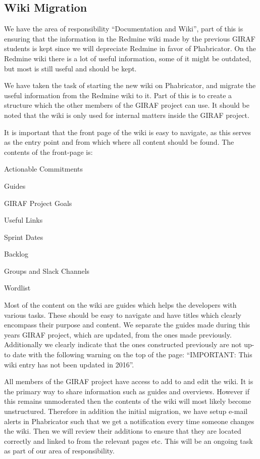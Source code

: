 \subsection{Wiki Migration}
We have the area of responsibility ``Documentation and Wiki'', part of this is ensuring that the information in the Redmine wiki made by the previous GIRAF students is kept since we will depreciate Redmine in favor of Phabricator.
On the Redmine wiki there is a lot of useful information, some of it might be outdated, but most is still useful and should be kept. 

We have taken the task of starting the new wiki on Phabricator, and migrate the useful information from the Redmine wiki to it.
Part of this is to create a structure which the other members of the GIRAF project can use.
It should be noted that the wiki is only used for internal matters inside the GIRAF project.  

It is important that the front page of the wiki is easy to navigate, as this serves as the entry point and from which where all content should be found. 
The contents of the front-page is:

\begin{multicols}{2}
\begin{enumberate}
    \item Actionable Commitments
    \item Guides
    \item GIRAF Project Goals
    \item Useful Links
    \item Sprint Dates
    \item Backlog
    \item Groups and Slack Channels
    \item Wordlist
\end{enumberate}
\end{multicols}

Most of the content on the wiki are guides which helps the developers with various tasks. 
These should be easy to navigate and have titles which clearly encompass their purpose and content. 
We separate the guides made during this years GIRAF project, which are updated, from the ones made previously. 
Additionally we clearly indicate that the ones constructed previously are not up-to date with the following warning on the top of the page: ``IMPORTANT: This wiki entry has not been updated in 2016''. 

All members of the GIRAF project have access to add to and edit the wiki. 
It is the primary way to share information such as guides and overviews. 
However if this remains unmoderated then the contents of the wiki will most likely become unstructured. 
Therefore in addition the initial migration, we have setup e-mail alerts in Phabricator such that we get a notification every time someone changes the wiki.
Then we will review their additions to ensure that they are located correctly and linked to from the relevant pages etc. 
This will be an ongoing task as part of our area of responsibility.